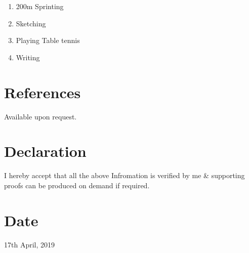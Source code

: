 \documentclass[margin,line]{res}
\begin{document}
\begin{resume}
\begin{enumerate}
\item 200m Sprinting
\item Sketching
\item Playing Table tennis
\item Writing

\end{enumerate}



\section{\sc \bf References }
Available upon request.

\section{\sc \bf Declaration}

I hereby accept that all the above Infromation is verified by me \& supporting proofs can be produced on demand if required.

\section{\sc \bf Date}

17th April, 2019




\end{resume}
\end{document}

